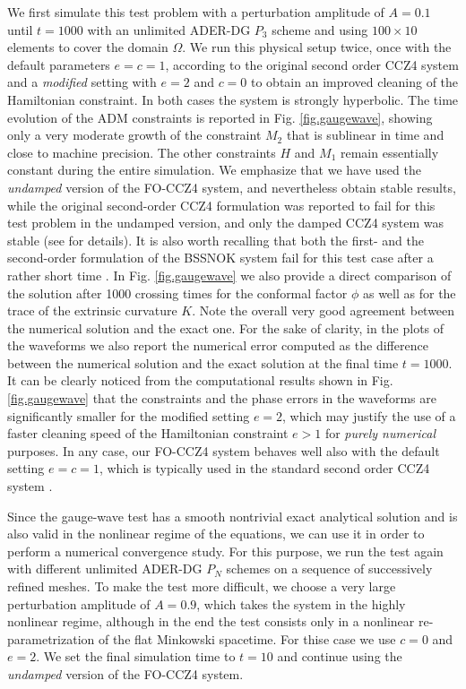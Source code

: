 We first simulate this test problem with a perturbation amplitude of
$A=0.1$ until $t=1000$ with an unlimited ADER-DG $P_3$ scheme and using
$100 \times 10$ elements to cover the domain $\Omega$. We run this
physical setup twice, once with the default parameters $e=c=1$, according
to the original second order CCZ4 system \cite{Alic:2011a} and a
\textit{modified} setting with $e=2$ and $c=0$ to obtain an improved
cleaning of the Hamiltonian constraint. In both cases the system is
strongly hyperbolic.  The time evolution of the ADM constraints is
reported in Fig. \ref{fig.gaugewave}, showing only a very moderate growth
of the constraint $M_2$ that is sublinear in time and close to machine
precision. The other constraints $H$ and $M_1$ remain essentially
constant during the entire simulation.  We emphasize that we have used
the \textit{undamped} version of the FO-CCZ4 system, and nevertheless
obtain stable results, while the original second-order CCZ4 formulation
was reported to fail for this test problem in the undamped version, and
only the damped CCZ4 system was stable (see \cite{Alic:2011a} for
details). It is also worth recalling that both the first- and the
second-order formulation of the BSSNOK system fail for this test case
after a rather short time \cite{Alic:2011a, Brown2012}. In
Fig. \ref{fig.gaugewave} we also provide a direct comparison of the
solution after 1000 crossing times for the conformal factor $\phi$ as
well as for the trace of the extrinsic curvature $K$.
Note the overall 
very good agreement between the numerical solution and the exact
one. For the sake of clarity, in the plots of the waveforms we also
report the numerical error computed as the difference between the 
numerical solution and the exact solution at the final time $t=1000$. 
It can be clearly noticed from the computational results shown in Fig. 
\ref{fig.gaugewave} that the constraints and the phase errors in the 
waveforms are significantly smaller for the 
modified setting $e=2$, which may justify the use of a faster cleaning 
speed of the Hamiltonian constraint $e>1$ for \textit{purely numerical} 
purposes. In any case, our FO-CCZ4 system behaves well also with the 
default setting $e=c=1$, which is typically used in the standard 
second order CCZ4 system \cite{Alic:2011a}.

Since the gauge-wave test has a smooth nontrivial exact analytical
solution and is also valid in the nonlinear regime of the equations, we
can use it in order to perform a numerical convergence study. For this
purpose, we run the test again with different unlimited ADER-DG $P_N$
schemes on a sequence of successively refined meshes. To make the test
more difficult, we choose a very large perturbation amplitude of $A=0.9$,
which takes the system in the highly nonlinear regime, although in the
end the test consists only in a nonlinear re-parametrization of the flat
Minkowski spacetime. For thise case we use $c=0$ and $e=2$. We set the 
final simulation time to $t=10$ and continue using the \textit{undamped} 
version of the FO-CCZ4 system. 

